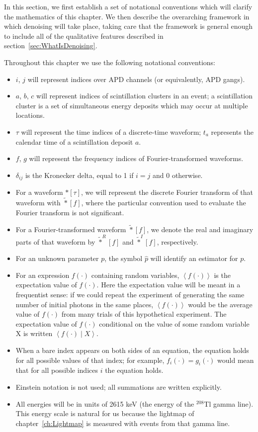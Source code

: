 In this section, we first establish a set of notational conventions which will clarify the mathematics of this chapter.  We then describe the overarching framework in which denoising will take place, taking care that the framework is general enough to include all of the qualitative features described in section~\ref{sec:WhatIsDenoising}.

Throughout this chapter we use the following notational conventions:
\begin{itemize}
\item $i$, $j$ will represent indices over APD channels (or equivalently, APD gangs).
\item $a$, $b$, $c$ will represent indices of scintillation clusters in an event; a scintillation cluster is a set of simultaneous energy deposits which may occur at multiple locations.
\item $\tau$ will represent the time indices of a discrete-time waveform; $t_a$ represents the calendar time of a scintillation deposit $a$.
\item $f$, $g$ will represent the frequency indices of Fourier-transformed waveforms.
\item $\delta_{ij}$ is the Kronecker delta, equal to 1 if $i = j$ and 0 otherwise.
\item For a waveform $*[\tau]$, we will represent the discrete Fourier transform of that waveform with $\widetilde{*}[f]$, where the particular convention used to evaluate the Fourier transform is not significant.
\item For a Fourier-transformed waveform $\widetilde{*}[f]$, we denote the real and imaginary parts of that waveform by $\widetilde{*}^R[f]$ and $\widetilde{*}^I[f]$, respectively.
\item For an unknown parameter $p$, the symbol $\widehat{p}$ will identify an estimator for $p$.
\item For an expression $f(\cdot)$ containing random variables, $\left<f(\cdot)\right>$ is the expectation value of $f(\cdot)$.  Here the expectation value will be meant in a frequentist sense: if we could repeat the experiment of generating the same number of initial photons in the same places, $\left<f(\cdot)\right>$ would be the average value of $f(\cdot)$ from many trials of this hypothetical experiment.  The expectation value of $f(\cdot)$ conditional on the value of some random variable X is written $\left<f(\cdot) \middle\vert X\right>$.
\item When a bare index appears on both sides of an equation, the equation holds for all possible values of that index; for example, $f_i(\cdot) = g_i(\cdot)$ would mean that for all possible indices $i$ the equation holds.
\item Einstein notation is not used; all summations are written explicitly.
\item All energies will be in units of 2615 keV (the energy of the $^{208}$Tl gamma line).  This energy scale is natural for us because the lightmap of chapter~\ref{ch:Lightmap} is measured with events from that gamma line.
\end{itemize}

